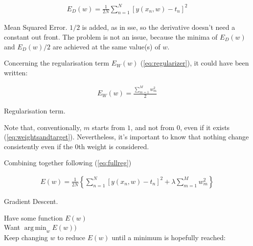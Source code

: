 \begin{Equation}[H]
	\centering
	\begin{equation} \label{eq:mser}
		\begin{aligned}
			E_D(w) = \frac{1}{2N} \sum_{n=1}^{N} [y(x_n,w)-t_n]^2
		\end{aligned}
	\end{equation}
	\caption[Mean Squared Error.]{Mean Squared Error. $1/2$ is added, as in \gls{sse}, so the derivative doesn't need a constant out front. The problem is not an issue, because the minima of $E_D(w)$ and $E_D(w) / 2$ are achieved at the same value(s) of $w$.}
\end{Equation}

\noindent Concerning the regularisation term $E_W(w)$ (\ref{eq:regularizer}), it could have been written:
\begin{Equation}[H]
	\centering
	\begin{equation} \label{eq:regnew}
		\begin{aligned}
			E_W(w) = \frac{ \sum_{m=1}^{M} {w^2_m}}{2}
		\end{aligned}
	\end{equation}
	\caption[Regularisation term.]{Regularisation term.}
\end{Equation}

\noindent Note that, conventionally, $m$ starts from $1$, and not from $0$, even if it exists (\ref{eq:weightsandtarget}). Nevertheless, it's important to know that nothing change consistently even if the 0th weight is considered. 

\noindent Combining together following (\ref{eq:fullreg}) 

\begin{Equation}[H]
	\centering
	\begin{equation} \label{eq:fullregnew}
	\begin{aligned}
	E(w) = \frac{1}{2N} \left\{ \sum_{n=1}^{N} [ y(x_n,w)-t_n ]^2 + \lambda \sum_{m=1}^{M} {w^2_m} \right\}
	\end{aligned}
	\end{equation}
	\caption{Gradient Descent.}
\end{Equation}

\noindent Have some function $E(w)$ \\
\noindent Want $\operatorname*{arg\,min}_w  E(w))$ \\

\noindent Keep changing $w$ to reduce $E(w)$ until a minimum is hopefully reached:

